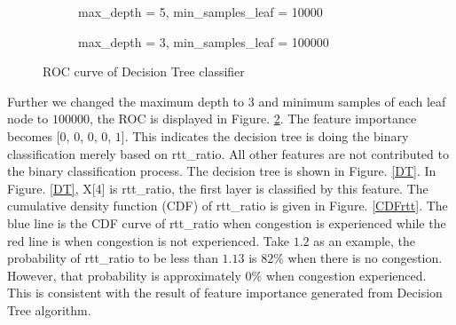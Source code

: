 \begin{figure}[!htb]\centering
   \begin{subfigure}{0.49\textwidth}
\caption{max\_depth = 5, min\_samples\_leaf = 10000}
\label{DecisionTreeRoc}

   \end{subfigure}
   \begin {subfigure}{0.49\textwidth}
\caption{max\_depth = 3, min\_samples\_leaf = 100000}
\label{DTRoc}
   \end{subfigure}
   \caption{ROC curve of Decision Tree classifier}
\label{fig:roc1}
\end{figure}
Further we changed the maximum depth to $3$ and minimum samples of each leaf node to $100000$, the ROC is displayed in Figure. \ref{DTRoc}. The feature importance becomes [$0$, $0$, $0$, $0$, $1$]. This indicates the decision tree is doing the binary classification merely based on rtt\_ratio. All other features are not contributed to the binary classification process. 
The decision tree is shown in Figure. \ref{DT}. In Figure. \ref{DT}, X[4] is rtt\_ratio, the first layer is classified by this feature. The cumulative density function (CDF) of rtt\_ratio is given in Figure. \ref{CDFrtt}. The blue line is the CDF curve of rtt\_ratio when congestion is experienced while the red line is when congestion is not experienced. Take $1.2$ as an example, the probability of rtt\_ratio to be less than $1.13$ is $82\%$ when there is no congestion. However, that probability is approximately $0\%$ when congestion experienced. This is consistent with the result of feature importance generated from Decision Tree algorithm. 

